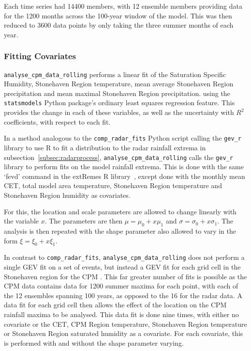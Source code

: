 Each time series had 14400 members,
    with 12 ensemble members providing data for the 1200 months across the 100-year window of the model.
This was then reduced to 3600 data points by only taking the three summer months of each year.

\subsubsection{Fitting Covariates}

\texttt{analyse\_cpm\_data\_rolling} performs a linear fit of the Saturation Specific Humidity,
    Stonehaven Region temperature, mean average Stonehaven Region precipitation and mean maximal Stonehaven Region precipitation.
    using the \texttt{statsmodels} Python package's ordinary least squares regression feature.
This provides the change in each of these variables, as well as the uncertainty with $R^2$ coefficients,
    with respect to each fit.

In a method analogous to the \texttt{comp\_radar\_fits} Python script calling the \texttt{gev\_r} library to use R to fit
    a distribution to the radar rainfall extrema in subsection~\ref{subsec:radarprocess},
    \texttt{analyse\_cpm\_data\_rolling} calls the \texttt{gev\_r} library to perform fits on the model rainfall extrema.
This is done with the same `fevd' command in the extRemes R library~\cite{extremes_R},
    except done with the monthly mean CET, total model area temperature, Stonehaven Region temperature and Stonehaven Region humidity as covariates.

For this,
    the location and scale parameters are allowed to change linearly with the variable $x$.
The parameters are then $\mu = \mu_0 + x\mu_1$ and $\sigma = \sigma_0 + x\sigma_1$.
The analysis is then repeated with the shape parameter also allowed to vary in the form $\xi = \xi_0 + x\xi_1$.

In contrast to \texttt{comp\_radar\_fits},
    \texttt{analyse\_cpm\_data\_rolling} does not perform a single GEV fit on a set of events,
    but instead a GEV fit for each grid cell in the Stonehaven region for the CPM .
This far greater number of fits is possible as the CPM data contains data for 1200 summer maxima for each point,
    with each of the 12 ensembles spanning 100 years,
    as opposed to the 16 for the radar data.
A data fit for each grid cell then allows the effect of the location on the CPM rainfall maxima to be analysed.
This data fit is done nine times,
    with either no covariate or the CET, CPM Region temperature, Stonehaven Region temperature or Stonehaven Region saturated humidity as a covariate.
For each covariate, this is performed with and without the shape parameter varying.


